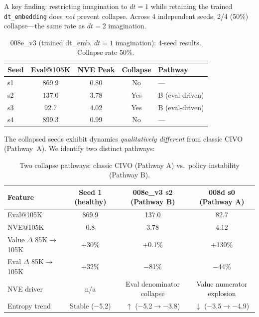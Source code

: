 \documentclass[10pt,letterpaper]{article}
\begin{document}
A key finding: restricting imagination to $dt=1$ while retaining the trained \texttt{dt\_embedding} does \emph{not} prevent collapse.
Across 4 independent seeds, 2/4 (50\%) collapse---the same rate as $dt=2$ imagination.

\begin{table}[h]
\centering
\caption{008e\_v3 (trained dt\_emb, $dt=1$ imagination): 4-seed results. Collapse rate 50\%.}
\label{tab:008e_v3_seeds}
\small
\begin{tabular}{@{}lcccl@{}}
\toprule
Seed & Eval@105K & NVE Peak & Collapse & Pathway \\
\midrule
s1 & 869.9 & 0.80 & No  & --- \\
s2 & 137.0 & 3.78 & Yes & B (eval-driven) \\
s3 & 92.7  & 4.02 & Yes & B (eval-driven) \\
s4 & 899.3 & 0.99 & No  & --- \\
\bottomrule
\end{tabular}
\end{table}

The collapsed seeds exhibit dynamics \emph{qualitatively different} from classic CIVO (Pathway~A).
We identify two distinct pathways:

\begin{table}[h]
\centering
\caption{Two collapse pathways: classic CIVO (Pathway A) vs.\ policy instability (Pathway B).}
\label{tab:dual_pathway}
\small
\begin{tabular}{@{}lccc@{}}
\toprule
Feature & Seed 1 (healthy) & 008e\_v3 s2 (Pathway B) & 008d s0 (Pathway A) \\
\midrule
Eval@105K            & 869.9              & 137.0                & 82.7 \\
NVE@105K             & 0.8                & 3.78                 & 4.12 \\
Value $\Delta$ 85K$\to$105K & +30\%       & +0.1\%               & +130\% \\
Eval $\Delta$ 85K$\to$105K  & +32\%       & $-$81\%              & $-$44\% \\
NVE driver           & n/a                & Eval denominator collapse & Value numerator explosion \\
Entropy trend        & Stable ($-$5.2)    & $\uparrow$ ($-$5.2$\to$$-$3.8)  & $\downarrow$ ($-$3.5$\to$$-$4.9) \\
\bottomrule
\end{tabular}
\end{table}
\end{document}
